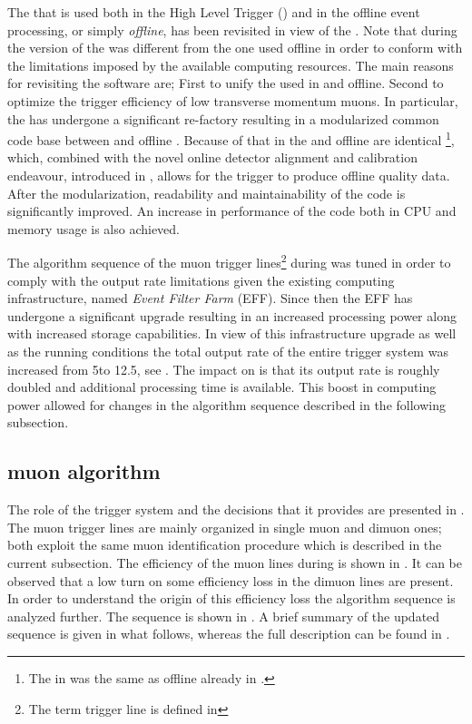 
The \muonID \cite{LHCb-PUB-2009-013,LHCb-PUB-2010-002} that is used both in the High Level Trigger (\hlt) \cite{LHCb-PUB-2011-017}
and in the offline event processing, or simply {\it offline}, has been revisited in view of the \lhc \runtwo.
Note that during \runone the \hlt version of the \muonID was different from the one used offline in order
to conform with the limitations imposed by the available computing resources. The main reasons for revisiting
the software are; First to unify the \muonID used in \hlt and offline.
Second to optimize the trigger efficiency of low transverse momentum muons.
In particular, the \muonID has undergone a significant re-factory resulting in a modularized common code base
between \hlt and offline \cite{kevinThesis}. Because of that \muonID in the \hltone and offline
are identical \footnote{The \muonID in \hlttwo was the same as offline already in \runone.},
which, combined with the novel online detector alignment and calibration endeavour, introduced in ,
allows for the trigger to produce offline quality data. After the modularization, readability and maintainability
of the code is significantly improved. An increase in performance of the \muonID code both in CPU and memory usage
is also achieved.

The algorithm sequence of the \hltone muon trigger lines\footnote{The term trigger line is defined in }
during \runone was tuned in order to comply with the output rate limitations given the existing computing infrastructure,
named {\it Event Filter Farm} (EFF). Since then the EFF has undergone a significant upgrade resulting in an
increased processing power along with increased storage capabilities. In view of this infrastructure upgrade
as well as the \runtwo \lhc running conditions the total output rate of the entire trigger system was increased
from 5\khz to 12.5\khz, see . The impact on \hltone is that its output rate is
roughly doubled and additional processing time is available. This boost in computing power allowed for changes
in the \muonID algorithm sequence described in the following subsection.

\subsection{\hltone muon algorithm}
\label{hlt1run2}

The role of the trigger system and the decisions that it provides are presented in .
The \hltone muon trigger lines are mainly organized in single muon and dimuon ones; both exploit the same
muon identification procedure which is described in the current subsection.
The efficiency of the muon lines during \runone is shown in .
It can be observed that a low \pt turn on some efficiency loss in the dimuon lines are present.
In order to understand the origin of this efficiency loss the \hltone algorithm sequence \cite{LHCb-PUB-2011-017}
is analyzed further. The sequence is shown  in . A brief summary of the
updated sequence is given in what follows, whereas the full description can be found in \cite{kevinThesis}.

